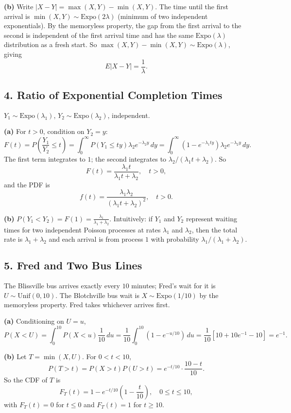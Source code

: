 \documentclass{article}
\begin{document}
\textbf{(b)} Write $|X-Y|=\max(X,Y)-\min(X,Y)$. The time until the first arrival is $\min(X,Y)\sim\text{Expo}(2\lambda)$ (minimum of two independent exponentials). By the memoryless property, the gap from the first arrival to the second is independent of the first arrival time and has the same $\text{Expo}(\lambda)$ distribution as a fresh start. So $\max(X,Y)-\min(X,Y)\sim\text{Expo}(\lambda)$, giving
$$
E|X-Y| = \frac{1}{\lambda}.
$$

\subsection*{4. Ratio of Exponential Completion Times}

$Y_1\sim\text{Expo}(\lambda_1)$, $Y_2\sim\text{Expo}(\lambda_2)$, independent.

\textbf{(a)} For $t>0$, condition on $Y_2=y$:
$$
F(t) = P\!\left(\frac{Y_1}{Y_2}\le t\right) = \int_0^\infty P(Y_1\le ty)\lambda_2 e^{-\lambda_2 y}\,dy = \int_0^\infty(1-e^{-\lambda_1 ty})\lambda_2 e^{-\lambda_2 y}\,dy.
$$
The first term integrates to $1$; the second integrates to $\lambda_2/(\lambda_1 t+\lambda_2)$. So
$$
F(t) = \frac{\lambda_1 t}{\lambda_1 t+\lambda_2}, \quad t>0,
$$
and the PDF is
$$
f(t) = \frac{\lambda_1\lambda_2}{(\lambda_1 t+\lambda_2)^2}, \quad t>0.
$$

\textbf{(b)} $P(Y_1<Y_2) = F(1) = \frac{\lambda_1}{\lambda_1+\lambda_2}$. Intuitively: if $Y_1$ and $Y_2$ represent waiting times for two independent Poisson processes at rates $\lambda_1$ and $\lambda_2$, then the total rate is $\lambda_1+\lambda_2$ and each arrival is from process $1$ with probability $\lambda_1/(\lambda_1+\lambda_2)$.

\subsection*{5. Fred and Two Bus Lines}

The Blissville bus arrives exactly every $10$ minutes; Fred's wait for it is $U\sim\text{Unif}(0,10)$. The Blotchville bus wait is $X\sim\text{Expo}(1/10)$ by the memoryless property. Fred takes whichever arrives first.

\textbf{(a)} Conditioning on $U=u$,
$$
P(X<U) = \int_0^{10}P(X<u)\frac{1}{10}\,du = \frac{1}{10}\int_0^{10}(1-e^{-u/10})\,du = \frac{1}{10}\!\left[10+10e^{-1}-10\right] = e^{-1}.
$$

\textbf{(b)} Let $T=\min(X,U)$. For $0<t<10$,
$$
P(T>t) = P(X>t)P(U>t) = e^{-t/10}\cdot\frac{10-t}{10}.
$$
So the CDF of $T$ is
$$
F_T(t) = 1-e^{-t/10}\!\left(1-\frac{t}{10}\right), \quad 0\le t\le10,
$$
with $F_T(t)=0$ for $t\le0$ and $F_T(t)=1$ for $t\ge10$.
\end{document}
